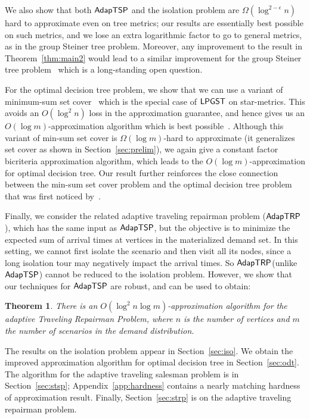 \documentclass[11pt]{article}
\newtheorem{theorem}[thm]{Theorem}
\def\stsp{\ensuremath{{\sf AdapTSP}}\xspace}
\def\strp{\ensuremath{{\sf AdapTRP}}\xspace}
\def\lpgst{\ensuremath{{\sf LPGST}}\xspace}
\def\dtp{optimal decision tree problem\xspace}
\begin{document}
We also show that both \stsp and the isolation problem are $\Omega(\log^{2-\epsilon} n)$ hard to approximate even on tree metrics;
our results are essentially best possible on such metrics, and we lose an extra logarithmic factor to go to general
metrics, as in the group Steiner tree problem. Moreover, any improvement to the result in Theorem~\ref{thm:main2} would lead to a similar improvement for the group Steiner tree problem~\cite{gkr,hk03,cp05} which is a long-standing open question. 

For the \dtp, we show that we can use a variant of minimum-sum set cover~\cite{FLT04} which is the special case of \lpgst on star-metrics. This avoids an $O(\log^2 n)$ loss in the approximation guarantee, and hence gives us an $O(\log
m)$-approximation algorithm which is best possible~\cite{CPRAM11}. Although this  variant of min-sum set cover is $\Omega(\log m)$-hard to approximate (it
generalizes set cover as shown in Section~\ref{sec:prelim}), we again give a constant factor bicriteria approximation algorithm, which leads to the $O(\log
m)$-approximation for optimal decision tree. Our result further reinforces the close connection between the min-sum set
cover problem and the \dtp that was first noticed by~\cite{CPRAM11}.

Finally, we consider the related adaptive traveling repairman problem (\strp), which has the same input as \stsp, but
the objective is to minimize the expected sum of arrival times at vertices in the materialized demand set. In this setting, we
cannot first isolate the scenario and then visit all its nodes, since a long isolation tour may negatively impact the
arrival times. So \strp (unlike \stsp) cannot be reduced to the isolation problem. However, we show that our techniques for \stsp
are robust, and can be used to obtain:
\begin{theorem}
  \label{thm:main3}
  There is an $O(\log^2 n \log m)$-approximation algorithm for
  the adaptive Traveling Repairman Problem, where $n$ is the number of vertices and $m$ the number of scenarios in the
  demand distribution.
\end{theorem}

\medskip
{} The results on the isolation problem appear in Section~\ref{sec:iso}. We obtain the improved approximation algorithm for
optimal decision tree in Section~\ref{sec:odt}. The algorithm for the adaptive traveling salesman problem is in Section~\ref{sec:stsp}; Appendix~\ref{app:hardness} contains a nearly matching  hardness of approximation result. Finally, Section~\ref{sec:strp} is on the adaptive traveling repairman problem.
\end{document}
